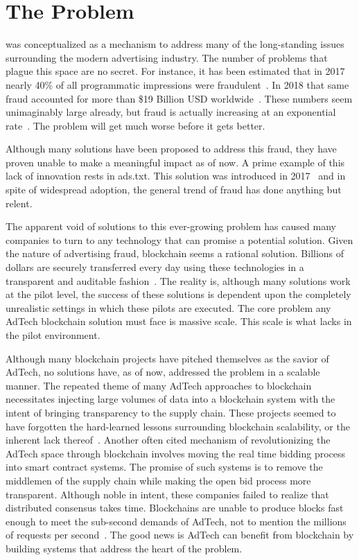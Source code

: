 \section{The Problem}
\LayerTwo{} was conceptualized as a mechanism to address many of the
long-standing issues surrounding the modern advertising industry.
The number of problems that plague this space are no secret.
For instance, it has been estimated that in 2017 nearly 40\%  of all
programmatic impressions were fraudulent~\cite{DigitalAdFraud2018}.
In 2018 that same fraud accounted for more than \$19 Billion USD
worldwide~\cite{DigitalAdFraud2018}.
These numbers seem unimaginably large already, but fraud is actually
increasing at an exponential rate~\cite{DigitalAdFraud2018}.
The problem will get much worse before it gets better.

Although many solutions have been proposed to address this fraud, they
have proven unable to make a meaningful impact as of now.
A prime example of this lack of innovation rests in ads.txt.
This solution was introduced in 2017~\cite{IABAdsTxt}
and in spite of widespread adoption, the general trend of
fraud has done anything but relent.

The apparent void of solutions to this ever-growing problem has caused
many companies to turn to any technology that can promise a potential solution.
Given the nature of advertising fraud, blockchain seems a rational solution.
Billions of dollars are securely transferred every day using these
technologies in a transparent and auditable fashion~\cite{EthDVT}.
The reality is, although many solutions work at the pilot level, the
success of these solutions is dependent upon the completely unrealistic
settings in which these pilots are executed.
The core problem any AdTech blockchain solution must face is massive scale.
This scale is what lacks in the pilot environment.

Although many blockchain projects have pitched themselves as the savior
of AdTech, no solutions have, as of now, addressed the problem in a
scalable manner.
The repeated theme of many AdTech approaches to blockchain necessitates
injecting large volumes of data into a blockchain system with the
intent of bringing transparency to the supply chain.
These projects seemed to have forgotten the hard-learned lessons
surrounding blockchain scalability, or the inherent
lack thereof~\cite{BlockchainScaling}.
Another often cited mechanism of revolutionizing the AdTech space
through blockchain involves moving the real time bidding process into
smart contract systems.
The promise of such systems is to remove the middlemen of the supply
chain while making the open bid process more transparent.
Although noble in intent, these companies failed to realize that
distributed consensus takes time.
Blockchains are unable to produce blocks fast enough to meet the
sub-second demands of AdTech, not to mention the millions of requests
per second~\cite{BlockchainTPS}.
The good news is AdTech can benefit from blockchain by building systems
that address the heart of the problem.

